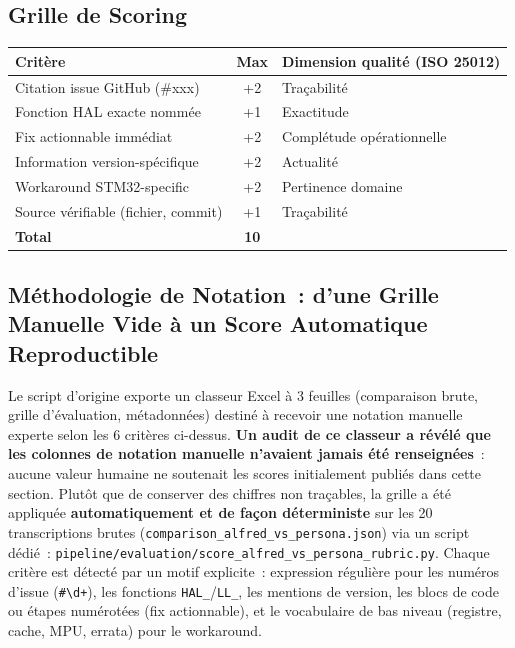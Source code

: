 \subsection{Grille de Scoring}

\begin{longtable}{p{4.5cm}cp{6cm}}
\toprule
\textbf{Critère} & \textbf{Max} & \textbf{Dimension qualité (ISO 25012)} \\
\midrule
Citation issue GitHub (\#xxx) & +2 & Traçabilité \\
Fonction HAL exacte nommée & +1 & Exactitude \\
Fix actionnable immédiat & +2 & Complétude opérationnelle \\
Information version-spécifique & +2 & Actualité \\
Workaround STM32-specific & +2 & Pertinence domaine \\
Source vérifiable (fichier, commit) & +1 & Traçabilité \\
\midrule
\textbf{Total} & \textbf{10} & \\
\bottomrule
\end{longtable}

\subsection{Méthodologie de Notation~: d'une Grille Manuelle Vide à un Score Automatique Reproductible}
\label{sec:comparative_methodo_notation}

Le script d'origine exporte un classeur Excel à 3 feuilles (comparaison brute, grille d'évaluation, métadonnées) destiné à recevoir une notation manuelle experte selon les 6 critères ci-dessus. \textbf{Un audit de ce classeur a révélé que les colonnes de notation manuelle n'avaient jamais été renseignées}~: aucune valeur humaine ne soutenait les scores initialement publiés dans cette section. Plutôt que de conserver des chiffres non traçables, la grille a été appliquée \textbf{automatiquement et de façon déterministe} sur les 20 transcriptions brutes (\texttt{comparison\_alfred\_vs\_persona.json}) via un script dédié~: \texttt{pipeline/evaluation/score\_alfred\_vs\_persona\_rubric.py}. Chaque critère est détecté par un motif explicite~: expression régulière pour les numéros d'issue (\texttt{\#\textbackslash d+}), les fonctions \texttt{HAL\_}/\texttt{LL\_}, les mentions de version, les blocs de code ou étapes numérotées (fix actionnable), et le vocabulaire de bas niveau (registre, cache, MPU, errata) pour le workaround.

